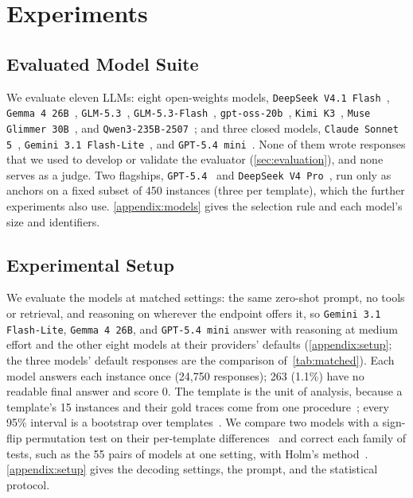 \section{Experiments}
\label{sec:experiments}

\subsection{Evaluated Model Suite}
\label{subsec:models}

We evaluate eleven LLMs: eight open-weights models,
\texttt{DeepSeek V4.1 Flash}~\citep{deepseekv41}, \texttt{Gemma 4 26B}~\citep{gemma4},
\texttt{GLM-5.3}~\citep{glm5}, \texttt{GLM-5.3-Flash}~\citep{glm5},
\texttt{gpt-oss-20b}~\citep{gptoss}, \texttt{Kimi K3}~\citep{kimik3},
\texttt{Muse Glimmer 30B}~\citep{museglimmer}, and \texttt{Qwen3-235B-2507}~\citep{qwen3}; and three
closed models, \texttt{Claude Sonnet 5}~\citep{claudesonnet5},
\texttt{Gemini 3.1 Flash-Lite}~\citep{gemini31flashlite}, and \texttt{GPT-5.4 mini}~\citep{gpt54}.
None of them wrote responses that we used to develop or validate the evaluator
(\autoref{sec:evaluation}), and none serves as a judge.
Two flagships, \texttt{GPT-5.4}~\citep{gpt54} and \texttt{DeepSeek V4 Pro}~\citep{deepseekv4}, run
only as anchors on a fixed subset of 450 instances (three per template), which the further
experiments also use.
\autoref{appendix:models} gives the selection rule and each model's size and identifiers.

\subsection{Experimental Setup}
\label{subsec:setup}

We evaluate the models at matched settings: the same zero-shot prompt, no tools or retrieval, and
reasoning on wherever the endpoint offers it, so \texttt{Gemini 3.1 Flash-Lite},
\texttt{Gemma 4 26B}, and \texttt{GPT-5.4 mini} answer with reasoning at medium effort and the
other eight models at their providers' defaults (\autoref{appendix:setup}; the three models'
default responses are the comparison of~\autoref{tab:matched}).
Each model answers each instance once (24,750 responses); 263 (1.1\%) have no readable final
answer and score 0.
The template is the unit of analysis, because a template's 15 instances and their gold traces come
from one procedure~\citep{miller2024errorbars}; every 95\% interval is a bootstrap over
templates~\citep{efron1993bootstrap}.
We compare two models with a sign-flip permutation test on their per-template
differences~\citep{dror2018hitchhiker} and correct each family of tests, such as the 55 pairs of
models at one setting, with Holm's method~\citep{holm1979simple}.
\autoref{appendix:setup} gives the decoding settings, the prompt, and the statistical protocol.
